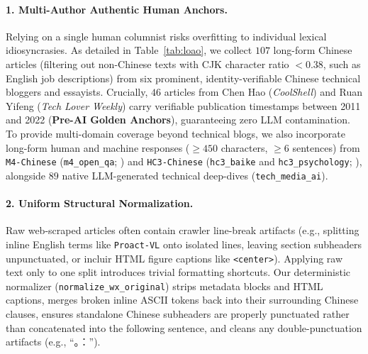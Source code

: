 \documentclass[11pt]{article}
\newcommand{\zh}[1]{#1}
\begin{document}
\paragraph{1. Multi-Author Authentic Human Anchors.}
Relying on a single human columnist risks overfitting to individual lexical idiosyncrasies. As detailed in Table~\ref{tab:loao}, we collect $107$ long-form Chinese articles (filtering out non-Chinese texts with CJK character ratio $< 0.38$, such as English job descriptions) from six prominent, identity-verifiable Chinese technical bloggers and essayists. Crucially, $46$ articles from Chen Hao (\textit{CoolShell}) and Ruan Yifeng (\textit{Tech Lover Weekly}) carry verifiable publication timestamps between 2011 and 2022 (\textbf{Pre-AI Golden Anchors}), guaranteeing zero LLM contamination. To provide multi-domain coverage beyond technical blogs, we also incorporate long-form human and machine responses ($\ge 450$ characters, $\ge 6$ sentences) from \texttt{M4-Chinese} (\texttt{m4\_open\_qa}; \citealt{wang2024m4}) and \texttt{HC3-Chinese} (\texttt{hc3\_baike} and \texttt{hc3\_psychology}; \citealt{guo2023hc3}), alongside $89$ native LLM-generated technical deep-dives (\texttt{tech\_media\_ai}).

\paragraph{2. Uniform Structural Normalization.}
Raw web-scraped articles often contain crawler line-break artifacts (e.g., splitting inline English terms like \texttt{Proact-VL} onto isolated lines, leaving section subheaders unpunctuated, or incluir HTML figure captions like \texttt{<center>}). Applying raw text only to one split introduces trivial formatting shortcuts. Our deterministic normalizer (\texttt{normalize\_wx\_original}) strips metadata blocks and HTML captions, merges broken inline ASCII tokens back into their surrounding Chinese clauses, ensures standalone Chinese subheaders are properly punctuated rather than concatenated into the following sentence, and cleans any double-punctuation artifacts (e.g., ``\zh{。：}'').
\end{document}
